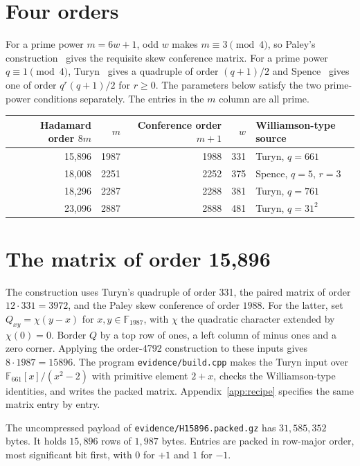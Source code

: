 \documentclass[10pt]{article}
\begin{document}
\section{Four orders}

For a prime power $m=6w+1$, odd $w$ makes $m\equiv3\pmod4$, so Paley's construction~\cite{Pa33} gives the requisite skew conference matrix. For a prime power $q\equiv1\pmod4$, Turyn~\cite{Tu72} gives a quadruple of order $(q+1)/2$ and Spence~\cite[Theorem~4]{Sp77} gives one of order $q^r(q+1)/2$ for $r\ge0$. The parameters below satisfy the two prime-power conditions separately. The entries in the $m$ column are all prime.
\begin{center}
\begin{tabular}{@{}rrrrl@{}}
\toprule
Hadamard order $8m$ & $m$ & Conference order $m+1$ & $w$ & Williamson-type source\\
\midrule
15,896 & 1987 & 1988 & 331 & Turyn, $q=661$\\
18,008 & 2251 & 2252 & 375 & Spence, $q=5$, $r=3$\\
18,296 & 2287 & 2288 & 381 & Turyn, $q=761$\\
23,096 & 2887 & 2888 & 481 & Turyn, $q=31^2$\\
\bottomrule
\end{tabular}
\end{center}

\section{The matrix of order 15,896}

The construction uses Turyn's quadruple of order 331, the paired matrix of order $12\cdot331=3972$, and the Paley skew conference of order $1988$. For the latter, set $Q_{xy}=\chi(y-x)$ for $x,y\in\mathbb F_{1987}$, with $\chi$ the quadratic character extended by $\chi(0)=0$. Border $Q$ by a top row of ones, a left column of minus ones and a zero corner. Applying the order-4792 construction to these inputs gives $8\cdot1987=15896$. The program \texttt{evidence/build.cpp} makes the Turyn input over $\mathbb F_{661}[x]/(x^2-2)$ with primitive element $2+x$, checks the Williamson-type identities, and writes the packed matrix. Appendix~\ref{app:recipe} specifies the same matrix entry by entry.

The uncompressed payload of \texttt{evidence/H15896.packed.gz} has $31{,}585{,}352$ bytes. It holds $15{,}896$ rows of $1{,}987$ bytes. Entries are packed in row-major order, most significant bit first, with $0$ for $+1$ and $1$ for $-1$.
\end{document}
